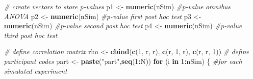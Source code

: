 \documentclass[
]{book}
\newenvironment{Shaded}{\begin{snugshade}}{\end{snugshade}}
\newcommand{\CommentTok}[1]{\textcolor[rgb]{0.56,0.35,0.01}{\textit{#1}}}
\newcommand{\ControlFlowTok}[1]{\textcolor[rgb]{0.13,0.29,0.53}{\textbf{#1}}}
\newcommand{\DecValTok}[1]{\textcolor[rgb]{0.00,0.00,0.81}{#1}}
\newcommand{\KeywordTok}[1]{\textcolor[rgb]{0.13,0.29,0.53}{\textbf{#1}}}
\newcommand{\NormalTok}[1]{#1}
\newcommand{\OperatorTok}[1]{\textcolor[rgb]{0.81,0.36,0.00}{\textbf{#1}}}
\newcommand{\StringTok}[1]{\textcolor[rgb]{0.31,0.60,0.02}{#1}}
\begin{document}
\begin{Shaded}
\begin{Highlighting}[]
\CommentTok{# create vectors to store p-values}
\NormalTok{p1 <-}\StringTok{ }\KeywordTok{numeric}\NormalTok{(nSim) }\CommentTok{#p-value omnibus ANOVA}
\NormalTok{p2 <-}\StringTok{ }\KeywordTok{numeric}\NormalTok{(nSim) }\CommentTok{#p-value first post hoc test}
\NormalTok{p3 <-}\StringTok{ }\KeywordTok{numeric}\NormalTok{(nSim) }\CommentTok{#p-value second post hoc test}
\NormalTok{p4 <-}\StringTok{ }\KeywordTok{numeric}\NormalTok{(nSim) }\CommentTok{#p-value third post hoc test}

\CommentTok{# define correlation matrix}
\NormalTok{rho <-}\StringTok{ }\KeywordTok{cbind}\NormalTok{(}\KeywordTok{c}\NormalTok{(}\DecValTok{1}\NormalTok{, r, r), }\KeywordTok{c}\NormalTok{(r, }\DecValTok{1}\NormalTok{, r), }\KeywordTok{c}\NormalTok{(r, r, }\DecValTok{1}\NormalTok{))}
\CommentTok{# define participant codes}
\NormalTok{part <-}\StringTok{ }\KeywordTok{paste}\NormalTok{(}\StringTok{"part"}\NormalTok{,}\KeywordTok{seq}\NormalTok{(}\DecValTok{1}\OperatorTok{:}\NormalTok{N))}
\ControlFlowTok{for}\NormalTok{ (i }\ControlFlowTok{in} \DecValTok{1}\OperatorTok{:}\NormalTok{nSim) \{}
  \CommentTok{#for each simulated experiment}


\end{Highlighting}
\end{Shaded}
\end{document}
